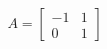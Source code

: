 \documentclass[preview]{standalone}
\begin{document}
\begin{align*}
A = \begin{bmatrix} -1 & 1 \\ 0 & 1 \end{bmatrix}
\end{align*}
\end{document}
